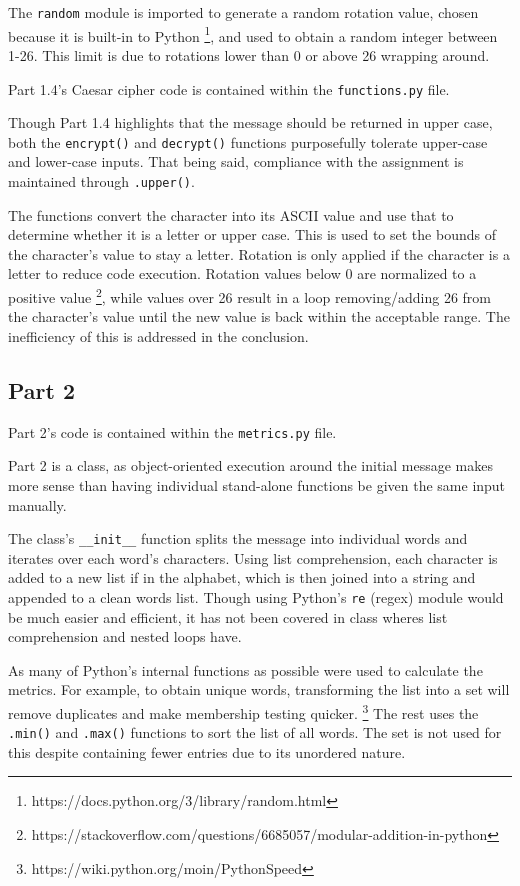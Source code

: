 \documentclass{article}
\begin{document}
The \texttt{random} module is imported to generate a random rotation value,  chosen because it is built-in to Python \footnote{https://docs.python.org/3/library/random.html}, and used to obtain a random integer between 1-26. This limit is due to rotations lower than 0 or above 26 wrapping around.

Part 1.4's Caesar cipher code is contained within the \texttt{functions.py} file.

Though Part 1.4 highlights that the message should be returned in upper case, both the \texttt{encrypt()} and \texttt{decrypt()} functions purposefully tolerate upper-case and lower-case inputs. That being said, compliance with the assignment is maintained through \texttt{.upper()}.

The functions convert the character into its ASCII value and use that to determine whether it is a letter or upper case. This is used to set the bounds of the character's value to stay a letter. Rotation is only applied if the character is a letter to reduce code execution. Rotation values below 0 are normalized to a positive value \footnote{https://stackoverflow.com/questions/6685057/modular-addition-in-python}, while values over 26 result in a loop removing/adding 26 from the character's value until the new value is back within the acceptable range. The inefficiency of this is addressed in the conclusion.

\subsection{Part 2}
Part 2's code is contained within the \texttt{metrics.py} file.

Part 2 is a class, as object-oriented execution around the initial message makes more sense than having individual stand-alone functions be given the same input manually.

The class's \texttt{\_\_init\_\_} function splits the message into individual words and iterates over each word's characters. Using list comprehension, each character is added to a new list if in the alphabet, which is then joined into a string and appended to a clean words list. Though using Python's \texttt{re} (regex) module would be much easier and efficient, it has not been covered in class wheres list comprehension and nested loops have.

As many of Python's internal functions as possible were used to calculate the metrics. For example, to obtain unique words, transforming the list into a set will remove duplicates and make membership testing quicker. \footnote{https://wiki.python.org/moin/PythonSpeed}
The rest uses the \texttt{.min()} and \texttt{.max()} functions to sort the list of all words. The set is not used for this despite containing fewer entries due to its unordered nature.  
\end{document}
